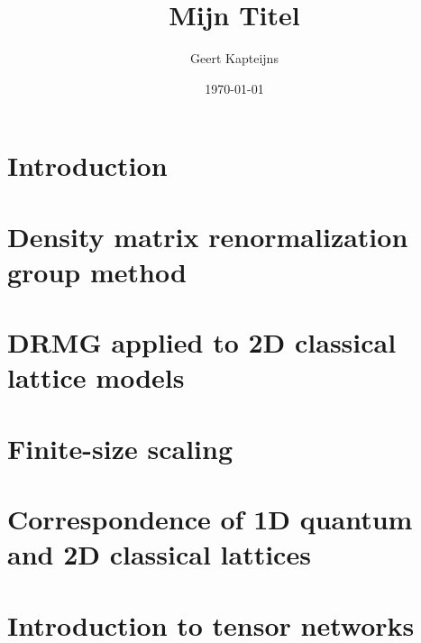 \documentclass[10pt, ebook, openany, oneside]{memoir}
\renewcommand{\afterchaptertitle}{%
 \vskip2em
 \hrule height 0.6pt
 \vskip2em
 }
\begin{document}
\pagestyle{simple}



\frontmatter

\title{Mijn Titel}
\author{Geert Kapteijns}
\date{\today}


\begingroup
\renewcommand{\afterchaptertitle}{}

\tableofcontents*
\endgroup

\mainmatter

\chapter{Introduction}


%

\chapter{Density matrix renormalization group method}


\chapter{DRMG applied to 2D classical lattice models}


\chapter{Finite-size scaling}




\appendix
\chapter{Correspondence of 1D quantum and 2D classical lattices}


\chapter{Introduction to tensor networks}



\backmatter
\printbibliography
\end{document}
